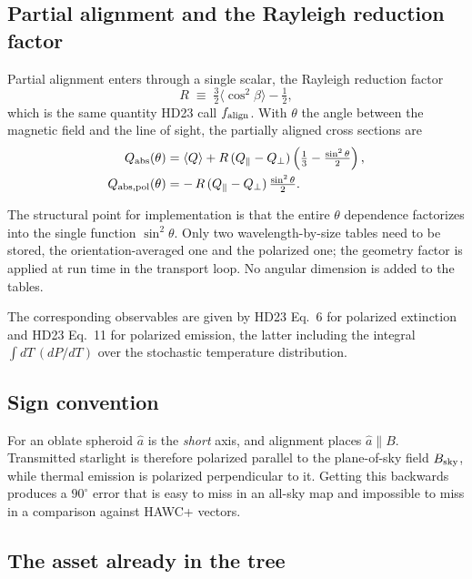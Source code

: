 \documentclass{my_memo}
\newcommand{\falign}{\ensuremath{f_{\rm align}}}
\begin{document}
\subsection{Partial alignment and the Rayleigh reduction factor}

Partial alignment enters through a single scalar, the Rayleigh reduction
factor
\begin{equation}
  R \;\equiv\; \tfrac32\langle\cos^2\beta\rangle - \tfrac12,
  \label{eq:Rdef}
\end{equation}
which is the same quantity HD23 call \falign. With $\theta$ the angle
between the magnetic field and the line of sight, the partially aligned
cross sections are
\begin{align}
  Q_{\rm abs}(\theta) &= \langle Q\rangle
     + R\,(Q_\parallel - Q_\perp)\left(\tfrac13 - \tfrac{\sin^2\theta}{2}\right),
     \label{eq:qabs} \\
  Q_{\rm abs,pol}(\theta) &= -\,R\,(Q_\parallel - Q_\perp)\,
     \tfrac{\sin^2\theta}{2}.
     \label{eq:qabspol}
\end{align}

The structural point for implementation is that the entire $\theta$
dependence factorizes into the single function $\sin^2\theta$. Only two
wavelength-by-size tables need to be stored, the orientation-averaged one
and the polarized one; the geometry factor is applied at run time in the
transport loop. No angular dimension is added to the tables.

The corresponding observables are given by HD23 Eq.~6 for polarized
extinction and HD23 Eq.~11 for polarized emission, the latter including
the integral $\int dT\,(dP/dT)$ over the stochastic temperature
distribution.

\subsection{Sign convention}

For an oblate spheroid $\hat a$ is the \emph{short} axis, and alignment
places $\hat a \parallel B$. Transmitted starlight is therefore polarized
parallel to the plane-of-sky field $B_{\rm sky}$, while thermal emission
is polarized perpendicular to it. Getting this backwards produces a
$90^\circ$ error that is easy to miss in an all-sky map and impossible to
miss in a comparison against HAWC+ vectors.

\subsection{The asset already in the tree}
\end{document}
